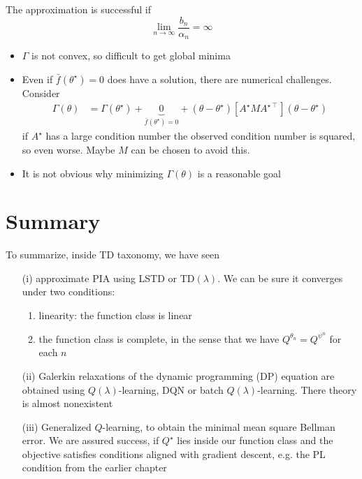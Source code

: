 The approximation is successful if \[\lim_{n\to\infty} \frac{b_n}{\alpha_n}=\infty\]

\begin{itemize}
    \item \(\Gamma\) is not convex, so difficult to get global minima
    \item Even if \(\bar{f}(\theta^\star)=0\) does have a solution, there are numerical challenges. Consider 
    \begin{align*}
        \Gamma(\theta)&=\Gamma(\theta^\star)+\underbrace{0}_{\bar{f}(\theta^\star)=0}+(\theta-\theta^\star)\left[A^\star MA^{\star\intercal}\right](\theta-\theta^\star)
    \end{align*}
    if \(A^\star\) has a large condition number the observed condition number is squared, so even worse. Maybe \(M\) can be chosen to 
    avoid this.
    \item It is not obvious why minimizing \(\Gamma(\theta)\) is a reasonable goal
\end{itemize}

\section{Summary}

To summarize, inside TD taxonomy, we have seen 
\begin{enumerate}
    \item[(i)] approximate PIA using LSTD or TD\((\lambda)\). We can be sure it converges under two conditions: \begin{enumerate}
        \item linearity: the function class is linear 
        \item the function class is complete, in the sense that we have \(Q^{\theta_n}=Q^{\psi^n}\) for each \(n\)  
    \end{enumerate}
    \item[(ii)] Galerkin relaxations of the dynamic programming (DP) equation are obtained using \(Q(\lambda)\)-learning, DQN or batch \(Q(\lambda)\)-learning. There theory is almost nonexistent
    \item[(iii)] Generalized \(Q\)-learning, to obtain the minimal mean square Bellman error. 
          We are assured success, if \(Q^\star\) lies inside our function class and the 
          objective satisfies conditions aligned with gradient descent, e.g. the PL condition from the earlier chapter 
\end{enumerate}

